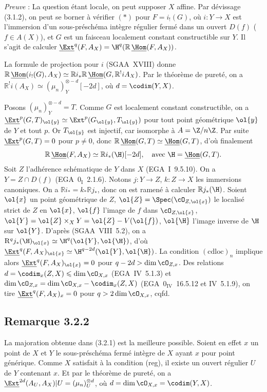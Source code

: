\emph{Preuve} : La question étant locale, on peut supposer $X$ affine. Par dévissage (3.1.2), on peut se borner à vérifier $(*)$ pour $F = i_{!}(G)$, où $i : Y \to X$ est l'immersion d'un sous-préschéma intègre régulier fermé dans un ouvert $D(f)$ ($f \in A(X)$), et $G$ est un faisceau localement constant
constructible sur $Y$. Il s'agit de calculer $\underline{\Ext}^q(F, A_X) = \H^q(\mathbb{R}\,\underline{\Hom}(F, A_X))$.

La formule de projection pour $i$ (SGAA~XVIII) donne $\mathbb{R}\,\underline{\Hom}(i_{!}(G), A_X) \simeq \mathbb{R} i_{*} \mathbb{R}\,\underline{\Hom}(G, \mathbb{R}^{!}iA_X)$. Par le théorème de pureté, on a $\mathbb{R}^{!}i(A_X) \simeq (\mu_n)^{\otimes -d}_Y[-2d]$, où $d = \codim(Y,X)$.

Posons $(\mu_n)^{\otimes -d}_Y = T$. Comme $G$ est localement constant constructible, on a $\underline{\Ext}^p(G,T)_{\ol{y}} \simeq \Ext^p(G_{\ol{y}}, T_{\ol{y}})$ pour tout point géométrique $\ol{y}$ de $Y$ et tout $p$. Or $T_{\ol{y}}$ est injectif, car isomorphe à $A = \Z/n\Z$. Par suite $\underline{\Ext}^p(G,T) = 0$ pour $p \neq 0$, donc $\mathbb{R}\,\underline{\Hom}(G,T) \simeq \underline{\Hom}(G,T)$, d'où finalement
\[
\mathbb{R}\,\underline{\Hom}(F, A_X) \simeq \mathbb{R} i_{*}(\H)[-2d], \quad \text{avec } \H = \underline{\Hom}(G,T).
\]
Soit $Z$ l'adhérence schématique de $Y$ dans $X$ (EGA~I~9.5.10). On a $Y = Z \cap D(f)$ (EGA~$0_{\mathrm{I}}$~2.1.6). Notons $j : Y \to Z$, $k : Z \to X$ les immersions canoniques. On a $\mathbb{R} i_{*} = k_{*} \mathbb{R} j_{*}$, donc on est ramené à calculer $\mathbb{R} j_{*}(\H)$. Soient $\ol{x}$ un point géométrique de $Z$, $\ol{Z} = \Spec(\cO_{Z,\ol{x}})$ le localisé strict de $Z$ en $\ol{x}$, $\ol{f}$ l'image de $f$ dans $\cO_{Z,\ol{x}}$, $\ol{Y} = \ol{Z} \times_X Y = \ol{Z} - V(\ol{f})$, $\ol{\H}$ l'image inverse de $\H$ sur $\ol{Y}$. D'après (SGAA~VIII~5.2), on a $\mathrm{R}^q j_{*}(\H)_{\ol{x}} \simeq \H^q(\ol{Y}, \ol{\H})$, d'où $\underline{\Ext}^q(F, A_X)_{\ol{x}} \simeq \H^{q-2d}(\ol{Y}, \ol{\H})$. La condition $(\mathrm{cdloc})_n$ implique alors $\underline{\Ext}^q(F, A_X)_{\ol{x}} = 0$ pour $q - 2d > \dim \cO_{Z,x}$. Des relations $d = \codim_{x}(Z,X) \leqslant \dim \cO_{X,x}$ (EGA~IV~5.1.3) et $\dim \cO_{Z,x} = \dim \cO_{X,x} - \codim_{x}(Z,X)$ (EGA~$0_{\mathrm{IV}}$~16.5.12 et IV~5.1.9), on tire $\underline{\Ext}^q(F, A_X)_x = 0$ pour $q > 2\dim \cO_{X,x}$, cqfd.

\subsection*{Remarque 3.2.2}
La majoration obtenue dans (3.2.1) est la meilleure possible. Soient en effet $x$ un point de $X$ et $Y$ le sous-préschéma fermé intègre de $X$ ayant $x$ pour point générique. Comme $X$ satisfait à la condition (reg), il existe un ouvert régulier $U$ de $Y$
contenant $x$. Et par le théorème de 
pureté, on a $\underline{\Ext}^{2d}(A_U, A_X)|U = (\mu_n)^{\otimes d}_U$, où $d = \dim \cO_{X,x} = \codim(Y,X)$.

